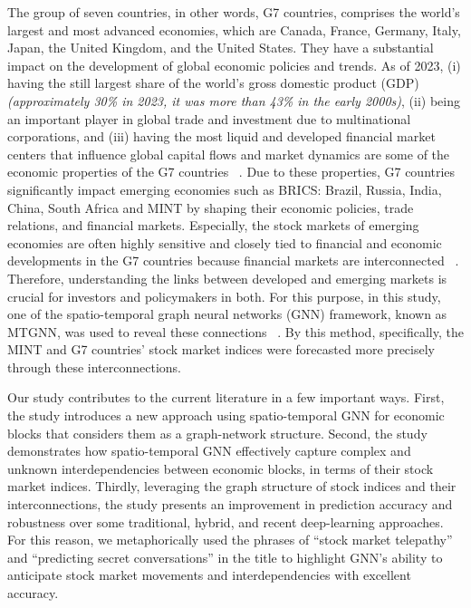 The group of seven countries, in other words, G7 countries, comprises the world's largest and most advanced economies, which are Canada, France, Germany, Italy, Japan, the United Kingdom, and the United States. They have a substantial impact on the development of global economic policies and trends.  As of 2023, (i) having the still largest share of the world's gross domestic product (GDP) \textit{(approximately 30\% in 2023, it was more than 43\% in the early 2000s)}, (ii) being an important player in global trade and investment due to multinational corporations, and (iii) having the most liquid and developed financial market centers that influence global capital flows and market dynamics are some of the economic properties of the G7 countries ~\citep{World, United, Statista}. Due to these properties, G7 countries significantly impact emerging economies such as BRICS: Brazil, Russia, India, China, South Africa and MINT by shaping their economic policies, trade relations, and financial markets. Especially, the stock markets of emerging economies are often highly sensitive and closely tied to financial and economic developments in the G7 countries because financial markets are interconnected ~\citep{fratzscher2012capital, rey2015dilemma, acharya2020financial}. Therefore, understanding the links between developed and emerging markets is crucial for investors and policymakers in both. For this purpose, in this study, one of the spatio-temporal graph neural networks (GNN) framework, known as MTGNN, was used to reveal these connections ~\citep{wu2020connecting}. By this method, specifically, the MINT and G7 countries' stock market indices were forecasted more precisely through these interconnections.

Our study contributes to the current literature in a few important ways. First, the study introduces a new approach using spatio-temporal GNN for economic blocks that considers them as a graph-network structure. Second, the study demonstrates how spatio-temporal GNN effectively capture complex and unknown interdependencies between economic blocks, in terms of their stock market indices. Thirdly, leveraging the graph structure of stock indices and their interconnections, the study presents an improvement in prediction accuracy and robustness over some traditional, hybrid, and recent deep-learning approaches. For this reason, we metaphorically used the phrases of ``stock market telepathy'' and ``predicting secret conversations'' in the title to highlight GNN's ability to anticipate stock market movements and interdependencies with excellent accuracy.


